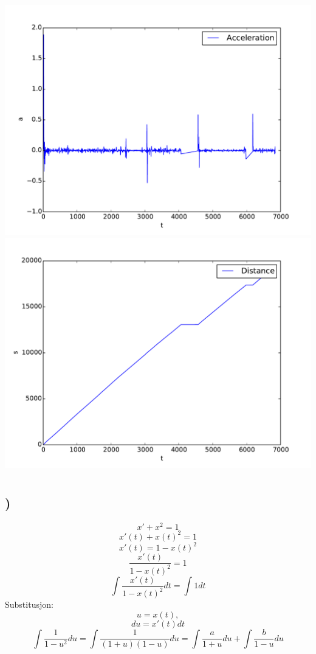 \documentclass[a4paper,10pt,norsk]{article}
\begin{document}
\includegraphics[scale=0.4]{a.pdf}
\includegraphics[scale=0.4]{s.pdf}

\section{}

\subsection{)}
\[x' + x^{2} = 1\]
\[x'(t) + x(t)^{2} = 1\]
\[x'(t) = 1 - x(t)^{2}\]
\[\frac{x'(t)}{1 - x(t)^{2}} = 1\]
\[\int{\frac{x'(t)}{1 - x(t)^{2}} dt} = \int{1dt}\]
Substitusjon: \[u = x(t),\] \[du = x'(t)dt\]
\[\int{\frac{1}{1-u^{2}}du} = \int{\frac{1}{(1+u)(1-u)}du} = \int{\frac{a}{1+u}du} + \int{\frac{b}{1-u}du}\]
\end{document}
